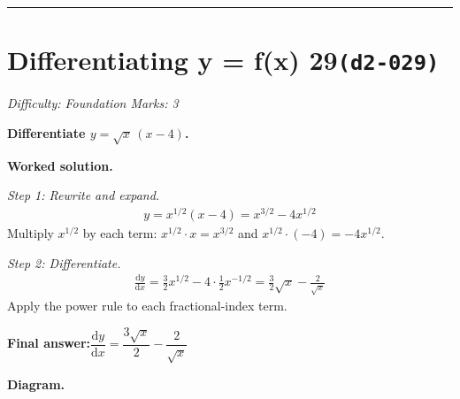 \documentclass[11pt]{article}
\newcommand{\question}[1]{\par\medskip\noindent\textbf{#1}\par}
\begin{document}
\medskip\hrule

\section*{Differentiating y = f(x) 29\quad\small\texttt{(d2-029)}}
\textit{Difficulty: Foundation \quad\textbar\quad Marks: 3}

\question{Differentiate \( y = \sqrt{x}\,(x - 4) \).}

\textbf{Worked solution.}

\textit{Step 1: Rewrite and expand.}
\[\begin{gathered}
y = x^{1/2}(x - 4) = x^{3/2} - 4x^{1/2}
\end{gathered}\]
Multiply \( x^{1/2} \) by each term: \( x^{1/2} \cdot x = x^{3/2} \) and \( x^{1/2} \cdot (-4) = -4x^{1/2} \).

\textit{Step 2: Differentiate.}
\[\begin{gathered}
\frac{\mathrm{d}y}{\mathrm{d}x} = \tfrac{3}{2}x^{1/2} - 4 \cdot \tfrac{1}{2}x^{-1/2} = \tfrac{3}{2}\sqrt{x} - \frac{2}{\sqrt{x}}
\end{gathered}\]
Apply the power rule to each fractional-index term.

\begin{answerbox}
\textbf{Final answer:}\quad \(\displaystyle  \dfrac{\mathrm{d}y}{\mathrm{d}x} = \dfrac{3\sqrt{x}}{2} - \dfrac{2}{\sqrt{x}} \)
\end{answerbox}
\textbf{Diagram.}
\end{document}
